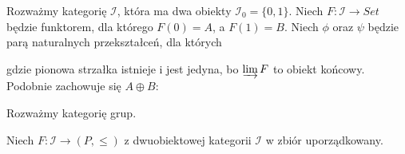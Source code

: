 %
%
%
Rozważmy kategorię $\mathcal{I}$, która ma dwa obiekty $\mathcal{I}_0=\{0,1\}$. Niech $F:\mathcal{I}\to Set$ będzie funktorem, dla którego $F(0)=A$, a $F(1)=B$. Niech $\phi$ oraz $\psi$ będzie parą naturalnych przekształceń, dla których
\begin{center}
\end{center}
gdzie pionowa strzałka istnieje i jest jedyna, bo $\varinjlim F$ to obiekt końcowy. Podobnie zachowuje się $A\oplus B$:
\begin{center}
\end{center}

\begin{example}[m]
\item 


  \item Rozważmy kategorię grup. 
    \begin{center}
    \end{center}
    \begin{center}
    \end{center}
  \item Niech $F:\mathcal{I}\to (P, \leq)$ z dwuobiektowej kategorii $\mathcal{I}$ w zbiór uporządkowany.
\end{example}

